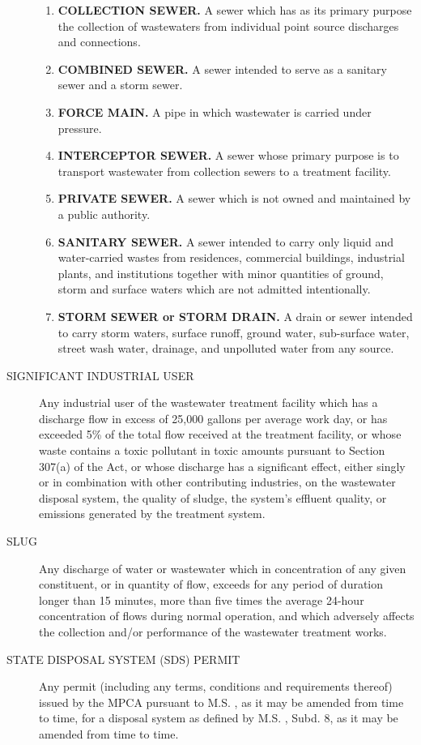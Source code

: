 \begin{description}
\begin{enumerate}
\item \textbf{COLLECTION SEWER.} A sewer which has as its primary purpose the collection of wastewaters from individual point source discharges and connections.
\item \textbf{COMBINED SEWER.} A sewer intended to serve as a sanitary sewer and a storm sewer.
\item \textbf{FORCE MAIN.} A pipe in which wastewater is carried under pressure.
\item \textbf{INTERCEPTOR SEWER.} A sewer whose primary purpose is to transport wastewater from collection sewers to a treatment facility.
\item \textbf{PRIVATE SEWER.} A sewer which is not owned and maintained by a public authority.
\item \textbf{SANITARY SEWER.} A sewer intended to carry only liquid and water-carried wastes from residences, commercial buildings, industrial plants, and institutions together with minor quantities of ground, storm and surface waters which are not admitted intentionally.
\item \textbf{STORM SEWER or STORM DRAIN.} A drain or sewer intended to carry storm waters, surface runoff, ground water, sub-surface water, street wash water, drainage, and unpolluted water from any source.
\end{enumerate}
\item[SIGNIFICANT INDUSTRIAL USER] Any industrial user of the wastewater treatment facility which has a discharge flow in excess of 25,000 gallons per average work day, or has exceeded 5\% of the total flow received at the treatment facility, or whose waste contains a toxic pollutant in toxic amounts pursuant to Section 307(a) of the Act, or whose discharge has a significant effect, either singly or in combination with other contributing industries, on the wastewater disposal system, the quality of sludge, the system’s effluent quality, or emissions generated by the treatment system.
\item[SLUG] Any discharge of water or wastewater which in concentration of any given constituent, or in quantity of flow, exceeds for any period of duration longer than 15 minutes, more than five times the average 24-hour concentration of flows during normal operation, and which adversely affects the collection and/or performance of the wastewater treatment works.
\item[STATE DISPOSAL SYSTEM (SDS) PERMIT] Any permit (including any terms, conditions and requirements thereof) issued by the MPCA pursuant to M.S. , as it may be amended from time to time, for a disposal system as defined by M.S. , Subd. 8, as it may be amended from time to time.

\end{description}
